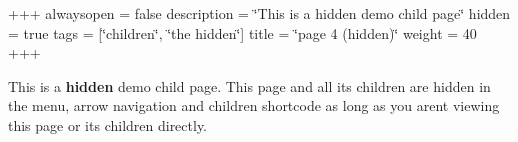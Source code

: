 +++ alwaysopen = false description = \char`\"{}\+This is a hidden demo child page\char`\"{} hidden = true tags = \mbox{[}\char`\"{}children\char`\"{}, \char`\"{}the hidden\char`\"{}\mbox{]} title = \char`\"{}page 4 (hidden)\char`\"{} weight = 40 +++

This is a {\bfseries{hidden}} demo child page. This page and all its children are hidden in the menu, arrow navigation and children shortcode as long as you aren\textquotesingle{}t viewing this page or its children directly. 